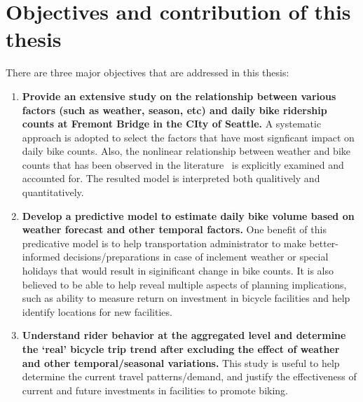 \documentclass [11pt, proquest] {uwthesis}[2015/03/03]
\begin{document}
\section{Objectives and contribution of this thesis}
There are three major objectives that are addressed in this thesis:
\begin{enumerate}
\item \textbf{Provide an extensive study on the relationship between various factors (such as weather, season, etc) and daily bike ridership counts at Fremont Bridge in the CIty of Seattle.} A systematic approach is adopted to select the factors that have most signficant impact on daily bike counts. Also, the nonlinear relationship between weather and bike counts that has been observed in the literature~\cite{} is explicitly examined and accounted for. The resulted model is interpreted both qualitively and quantitatively. 
\item \textbf{Develop a predictive model to estimate daily bike volume based on weather forecast and other temporal factors.} One benefit of this predicative model is to help transportation administrator to make better-informed decisions/preparations in case of inclement weather or special holidays that would result in siginificant change in bike counts. It is also believed to be able to help reveal multiple aspects of planning implications, such as ability to measure return on investment in bicycle facilities and help identify locations for new facilities.
\item \textbf{Understand rider behavior at the aggregated level and determine the `real' bicycle trip trend after excluding the effect of weather and other temporal/seasonal variations.} This study is useful to help determine the current travel patterns/demand, and justify the effectiveness of current and future investments in facilities to promote biking.
\end{enumerate}
\end{document}
